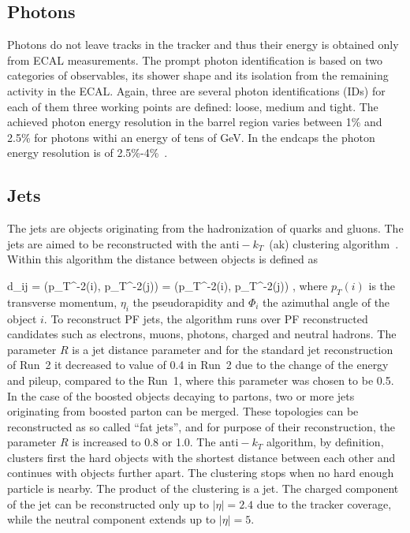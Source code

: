 

\subsection{Photons}

Photons do not leave tracks in the tracker and thus their energy is obtained only from ECAL measurements. The prompt photon identification is based on two categories of observables, its shower shape and its isolation from the remaining activity in the ECAL. Again, three are several photon identifications (IDs) for each of them three working points are defined: loose, medium and tight. The achieved photon energy resolution in the barrel region varies between 1\% and 2.5\% for photons withi an energy of tens of GeV. In the endcaps the photon energy resolution is of 2.5\%-4\%~\cite{CMS:EGM-14-001}.

\subsection{Jets}

The jets are objects originating from the hadronization of quarks and gluons. The jets are aimed to be reconstructed with the $\mathrm{anti-}k_{T}$~(ak) clustering algorithm~\cite{Cacciari:2008gp, Cacciari:2011ma}. Within this algorithm the distance between objects is defined as

{   
    d_{ij} = \left({p_{T}}^{-2}(i), {p_{T}}^{-2}(j)\right)  =  ({p_{T}}^{-2}(i), {p_{T}}^{-2}(j)) ,
}
where $p_{T}(i)$ is the transverse momentum, $\eta_{i}$  the pseudorapidity and $\Phi_{i}$ the azimuthal angle of the object $i$. To reconstruct PF jets, the algorithm runs over PF reconstructed candidates such as electrons, muons, photons, charged and neutral hadrons. The parameter $R$ is a jet distance parameter and for the standard jet reconstruction of Run~2 it decreased to value of 0.4 in Run~2 due to the change of the energy and pileup, compared to the Run~1, where this parameter was chosen to be 0.5. In the case of the boosted objects decaying to partons, two or more jets originating from boosted parton can be merged. These topologies can be reconstructed as so called ``fat jets'', and for purpose of their reconstruction, the parameter $R$ is increased to 0.8 or 1.0. The $\mathrm{anti-}k_{T}$ algorithm, by definition, clusters first the hard objects with the shortest distance between each other and continues with objects further apart. The clustering stops when no hard enough particle is nearby. The product of the clustering is a jet. The charged component of the jet can be reconstructed only up to $|\eta|=2.4$ due to the tracker coverage, while the neutral component extends up to  $|\eta|=5$.

